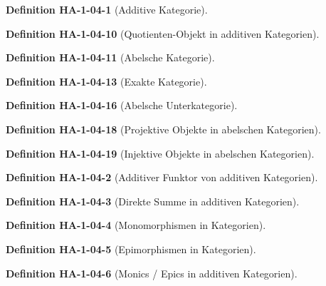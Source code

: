 \documentclass[10pt, letterpaper]{article}
\newcommand{\CustomHeading}[3]{%
  \par\medskip\noindent%
  \textbf{#1 #2} \textnormal{(#3)}.\enskip%
}
\newenvironment{DEF}[2]{\CustomHeading{Definition}{#1}{#2}}{}
\begin{document}
\begin{DEF}{HA-1-04-1}{Additive Kategorie}

\end{DEF}

\begin{DEF}{HA-1-04-10}{Quotienten-Objekt in additiven Kategorien}

\end{DEF}

\begin{DEF}{HA-1-04-11}{Abelsche Kategorie}

\end{DEF}

\begin{DEF}{HA-1-04-13}{Exakte Kategorie}

\end{DEF}

\begin{DEF}{HA-1-04-16}{Abelsche Unterkategorie}

\end{DEF}

\begin{DEF}{HA-1-04-18}{Projektive Objekte in abelschen Kategorien}

\end{DEF}

\begin{DEF}{HA-1-04-19}{Injektive Objekte in abelschen Kategorien}

\end{DEF}

\begin{DEF}{HA-1-04-2}{Additiver Funktor von additiven Kategorien}

\end{DEF}

\begin{DEF}{HA-1-04-3}{Direkte Summe in additiven Kategorien}

\end{DEF}

\begin{DEF}{HA-1-04-4}{Monomorphismen in Kategorien}

\end{DEF}

\begin{DEF}{HA-1-04-5}{Epimorphismen in Kategorien}

\end{DEF}

\begin{DEF}{HA-1-04-6}{Monics / Epics in additiven Kategorien}

\end{DEF}
\end{document}
